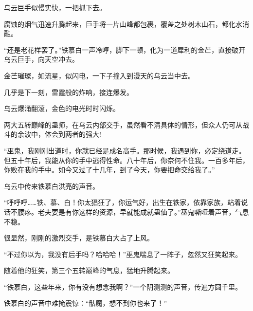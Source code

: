 \begin{this_body}
乌云巨手似慢实快，一把抓下去。

腐蚀的烟气迅速升腾起来，巨手将一片山峰都包裹，覆盖之处树木山石，都化水消融。

“还是老花样罢了。”铁慕白一声冷哼，脚下一顿，化为一道犀利的金芒，直接破开乌云巨手，向天空冲去。

金芒璀璨，如流星，似闪电，一下子撞入到漫天的乌云当中去。

几乎是下一刻，雷霆般的炸响，接连爆发。

乌云爆涌翻滚，金色的电光时时闪烁。

两大五转巅峰的蛊师，在乌云内部交手，虽然看不清具体的情形，但众人仍可从战斗的余波中，体会到两者的强大!

“巫鬼，我刚刚出道时，你就已经是成名高手。那时候，我遇到你，必定绕道走。但五十年后，我能从你的手中逃得性命。八十年后，你奈何不住我。一百多年后，你败在我的手中。如今又过了十几年，到了今天，你要把命交给我了。”

乌云中传来铁慕白洪亮的声音。

“呼呼呼……铁、慕、白！你太猖狂了，你运气好，出生在铁家，依靠家族，站着说话不腰疼。老夫要是有你这样的资源，早就能成就蛊仙了。”巫鬼嘶哑着声音，气息不稳。

很显然，刚刚的激烈交手，是铁慕白大占了上风。

“不过你以为，我没有后手吗？哈哈哈！”巫鬼喘息了一阵子，忽然又狂笑起来。

随着他的狂笑，第三个五转巅峰的气息，猛地升腾起来。

“铁慕白，这些年来，你有没有想念我啊？”一个阴测测的声音，传遍方圆千里。

铁慕白的声音中难掩震惊：“骷魔，想不到你也来了！”

\end{this_body}


